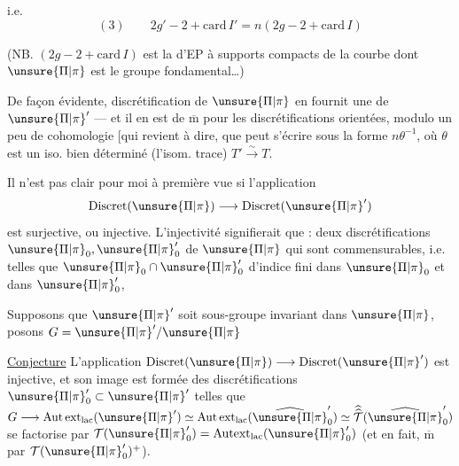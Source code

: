 i.e.
\[
(3)\qquad 2g'-2+\mathrm{card}\,I'=n(2g-2+\mathrm{card}\,I)
\]

(NB.  \((2g-2+\mathrm{card}\,I)\) est
 la  d'EP à supports
compacts de la courbe dont \(\unsure{\Pi|\pi}\) est le groupe
fondamental\ldots)


De façon évidente,  discrétification de \(\unsure{\Pi|\pi}\)
en fournit une de \(\unsure{\Pi|\pi}'\) --- et il en est de
\(\overline{\mathrm m}\) pour les discrétifications orientées, modulo
un peu de cohomologie [qui revient à dire,
que
peut s'écrire sous la forme \(n\theta^{-1}\), où \(\theta\) est un iso. bien
déterminé (l'isom. trace) \unsure{\(\theta\)} \(T'\xrightarrow{\sim}T\).

Il n'est pas clair pour moi à première
vue si l'application
\[
\mathrm{Discret}(\unsure{\Pi|\pi})\longrightarrow\mathrm{Discret}(\unsure{\Pi|\pi}')
\]
est surjective, ou injective. L'injectivité
signifierait que : deux discrétifications \(\unsure{\Pi|\pi}_0,\unsure{\Pi|\pi}'_0\) de
\(\unsure{\Pi|\pi}\) qui sont commensurables, i.e. telles que
\(\unsure{\Pi|\pi}_0\cap\unsure{\Pi|\pi}'_0\)  d'indice fini dans \(\unsure{\Pi|\pi}_0\) et dans \(\unsure{\Pi|\pi}'_0\),

Supposons que \(\unsure{\Pi|\pi}'\) soit sous-groupe invariant
dans \(\unsure{\Pi|\pi}\), posons \(G=\unsure{\Pi|\pi}'/\unsure{\Pi|\pi}\)

\uline{Conjecture} L'application \(\mathrm{Discret}(\unsure{\Pi|\pi})\longrightarrow\mathrm{Discret}(\unsure{\Pi|\pi}')\)
est injective, et son image est formée des
discrétifications \(\unsure{\Pi|\pi}'_0\subset\unsure{\Pi|\pi}'\) telles que
\(G\longrightarrow\mathrm{Aut\,ext}_{\mathrm{lac}}(\unsure{\Pi|\pi}')
\simeq\mathrm{Aut\,ext}_{\mathrm{lac}}(\widehat{\unsure{\Pi|\pi}}'_0)
\simeq\widehat{\widehat{\mathcal T}}(\widehat{\unsure{\Pi|\pi}}'_0)\)
se factorise par \(\mathcal T(\unsure{\Pi|\pi}'_0)=\mathrm{Autext}_{\mathrm{lac}}(\unsure{\Pi|\pi}'_0)\)
(et en fait, \(\overline{\mathrm m}\) par \(\mathcal T(\unsure{\Pi|\pi}'_0)^+\)).

